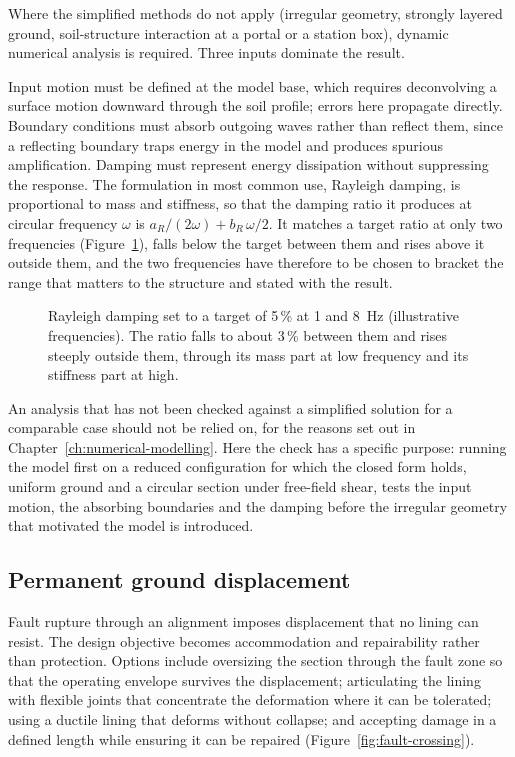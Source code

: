 Where the simplified methods do not apply (irregular geometry, strongly
layered ground, soil-structure interaction at a portal or a station box),
dynamic numerical analysis is required. Three inputs dominate the result.

Input motion must be defined at the model base, which requires deconvolving a
surface motion downward through the soil profile; errors here propagate
directly. Boundary conditions must absorb outgoing waves rather than reflect
them, since a reflecting boundary traps energy in the model and produces
spurious amplification. Damping must represent energy dissipation without
suppressing the response. The formulation in most common use, Rayleigh
damping, is proportional to mass and stiffness, so that the damping ratio it
produces at circular frequency $\omega$ is $a_R/(2\omega) + b_R\,\omega/2$. It
matches a target ratio at only two frequencies
(Figure~\ref{fig:rayleigh-damping}), falls below the target
between them and rises above it outside them, and the two frequencies have
therefore to be chosen to bracket the range that matters to the structure and
stated with the result.

\begin{figure}[htbp]
\centering
{}
\caption{Rayleigh damping set to a target of 5\,\% at 1 and 8~Hz (illustrative frequencies). The ratio falls to about 3\,\% between them and rises steeply outside them, through its mass part at low frequency and its stiffness part at high.}
\label{fig:rayleigh-damping}
\end{figure}

An analysis that has not been checked against a simplified solution for a
comparable case should not be relied on, for the reasons set out in
Chapter~\ref{ch:numerical-modelling}. Here the check has a specific purpose:
running the model first on a reduced configuration for which the closed form
holds, uniform ground and a circular section under free-field shear, tests
the input motion, the absorbing boundaries and the damping before the
irregular geometry that motivated the model is introduced.

\subsection{Permanent ground displacement}
\label{sec:permanent-displacement}

Fault rupture through an alignment imposes displacement that no lining can
resist. The design objective becomes accommodation and repairability rather
than protection. Options include oversizing the section through the fault zone
so that the operating envelope survives the displacement; articulating the
lining with flexible joints that concentrate the deformation where it can be
tolerated; using a ductile lining that deforms without collapse; and accepting
damage in a defined length while ensuring it can be repaired
(Figure~\ref{fig:fault-crossing}).


